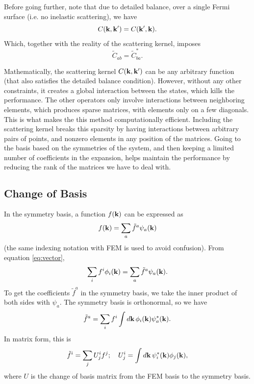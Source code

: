 \documentclass[12pt]{article}
\begin{document}
Before going further, note that due to detailed balance, over a single Fermi surface (i.e. no
inelastic scattering), we have
\begin{equation}
    C(\vb{k}, \vb{k'}) = C(\vb{k'}, \vb{k}).
\end{equation}
Which, together with the reality of the scattering kernel, imposes
\begin{equation}
    \tilde{C}_{ab} = \tilde{C}_{ba}^*.
\end{equation}

Mathematically, the scattering kernel $C(\vb{k}, \vb{k'})$ can be any arbitrary function (that also
satisfies the detailed balance condition). However, without any other constraints, it creates a
global interaction between the states, which kills the performance. The other operators only involve
interactions between neighboring elements, which produces sparse matrices, with elements only on a
few diagonals. This is what makes the this method computationally efficient. Including the
scattering kernel breaks this sparsity by having interactions between arbitrary pairs of points, and
nonzero elements in any position of the matrices. Going to the basis based on the symmetries of the
system, and then keeping a limited number of coefficients in the expansion, helps maintain the
performance by reducing the rank of the matrices we have to deal with.

\subsection{Change of Basis}
In the symmetry basis, a function $f(\vb{k})$ can be expressed as
\begin{equation}
    f(\vb{k}) = \sum_a \tilde{f}^a \psi_a(\vb{k})
\end{equation}
(the same indexing notation with FEM is used to avoid confusion). From equation \eqref{eq:vector},
\begin{equation}
    \sum_i f^i \phi_i(\vb{k}) = \sum_a \tilde{f}^a \psi_a(\vb{k}).
    \label{eq:vector_basis_expansion}
\end{equation}
To get the coefficients $\tilde{f}^a$ in the symmetry basis, we take the inner product of both
sides with $\psi_a$. The symmetry basis is orthonormal, so we have
\begin{equation}
    \tilde{f}^a = \sum_{i} f^i \int\dd{\vb{k}}\phi_i(\vb{k}) \psi_a^*(\vb{k}).
\end{equation}
In matrix form, this is
\begin{equation}
    \tilde{f}^i = \sum_j U^i_j f^j; \quad U^i_j = \int\dd{\vb{k}}\psi_i^*(\vb{k})\phi_j(\vb{k}),
\end{equation}
where $U$ is the change of basis matrix from the FEM basis to the symmetry basis.
\end{document}
